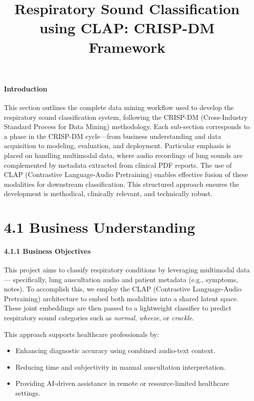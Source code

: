 
\title{Respiratory Sound Classification using CLAP: CRISP-DM Framework}

\paragraph{Introduction\\}
This section outlines the complete data mining workflow used to develop the respiratory sound classification system, following the CRISP-DM (Cross-Industry Standard Process for Data Mining) methodology. Each sub-section corresponds to a phase in the CRISP-DM cycle—from business understanding and data acquisition to modeling, evaluation, and deployment. Particular emphasis is placed on handling multimodal data, where audio recordings of lung sounds are complemented by metadata extracted from clinical PDF reports. The use of CLAP (Contrastive Language-Audio Pretraining) enables effective fusion of these modalities for downstream classification. This structured approach ensures the development is methodical, clinically relevant, and technically robust.


\section*{4.1 Business Understanding} 
\paragraph{4.1.1 Business Objectives\\}
This project aims to classify respiratory conditions by leveraging multimodal data — specifically, lung auscultation audio and patient metadata (e.g., symptoms, notes). To accomplish this, we employ the CLAP (Contrastive Language-Audio Pretraining) architecture to embed both modalities into a shared latent space. These joint embeddings are then passed to a lightweight classifier to predict respiratory sound categories such as \textit{normal}, \textit{wheeze}, or \textit{crackle}.

This approach supports healthcare professionals by:
\begin{itemize}
    \item Enhancing diagnostic accuracy using combined audio-text context.
    \item Reducing time and subjectivity in manual auscultation interpretation.
    \item Providing AI-driven assistance in remote or resource-limited healthcare settings.
\end{itemize}

